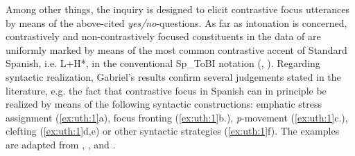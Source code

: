 \documentclass[output=paper]{langsci/langscibook}
\begin{document}
% 
% 
% 
% 
% 


Among other things, the inquiry is designed to elicit contrastive focus utterances by means of the above-cited \textit{yes/no}-questions. As far as intonation is concerned, contrastively and non-contrastively focused constituents in the data of \citet{Gabriel2007} are uniformly marked by means of the most common contrastive accent of Standard Spanish, i.e. L+H*, in the conventional Sp\_ToBI notation (\citealt[283]{Gabriel2007}, \citealt{Beckman.2002}). Regarding syntactic realization, Gabriel's \citeyearpar{Gabriel2007} results confirm several judgements stated in the literature, e.g. the fact that contrastive focus in Spanish can in principle be realized by means of the following syntactic constructions: emphatic stress assignment (\ref{ex:uth:1}a), focus fronting (\ref{ex:uth:1}b.), \textit{p}-movement (\ref{ex:uth:1}c.), clefting (\ref{ex:uth:1}d,e) or other syntactic strategies (\ref{ex:uth:1}f). The examples are adapted from \citet[377]{GutierrezBravo08}, \citet[20]{Zubizarreta98}, \citet[4229,4242]{Zubizarreta99} and \citet[283]{Gabriel2007}.
\end{document}
